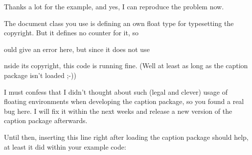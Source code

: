 Thanks a lot for the example, and yes, I can reproduce the problem now.

The document class you use is defining an own float type for typesetting
the copyright. But it defines no counter for it, so \caption would give
an error here, but since it does not use \caption inside its copyright,
this code is running fine. (Well at least as long as the caption package
isn't loaded ;-))

I must confess that I didn't thought about such (legal and clever) usage
of floating environments when developing the caption package, so you
found a real bug here. I will fix it within the next weeks and release a
new version of the caption package afterwards.

Until then, inserting this line right after loading the caption package
should help, at least it did within your example code:


\fi

